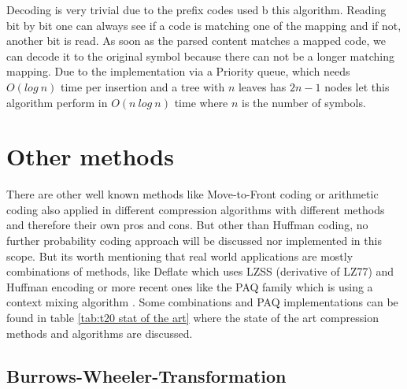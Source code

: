 \par{
Decoding is very trivial due to the prefix codes used b this algorithm. Reading bit by bit one can always see if a code is matching one of the mapping and if not, another bit is read. As soon as the parsed content matches a mapped code, we can decode it to the original symbol because there can not be a longer matching mapping. Due to the implementation via a Priority queue, which needs $O(log \: n)$ time per insertion and a tree with $n$ leaves has $2n-1$ nodes let this algorithm perform in $O(n \: log \: n)$ time where $n$ is the number of symbols.
}

\section{Other methods}
\label{ch:Principles of compression:sec:Other}
\par{
There are other well known methods like Move-to-Front coding or arithmetic coding also applied in different compression algorithms with different methods and therefore their own pros and cons. But other than Huffman coding, no further probability coding approach will be discussed nor implemented in this scope. But its worth mentioning that real world applications are mostly combinations of methods, like Deflate\cite{deutsch1996rfc1951} which uses LZSS\cite{10.1145/322344.322346} (derivative of LZ77) and Huffman encoding or more recent ones like the PAQ family which is using a context mixing algorithm \cite{mahoney2009data}. Some combinations and PAQ implementations can be found in table \ref{tab:t20 stat of the art} where the state of the art compression methods and algorithms are discussed.
}

\subsection{Burrows-Wheeler-Transformation}
\label{ch:Principles of compression:sec:Other:subSec:bwt}

